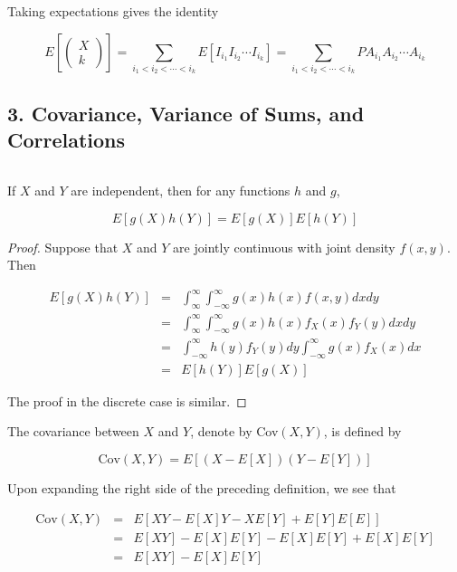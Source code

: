 Taking expectations gives the identity

$$E\left[ \left( \begin{matrix}
	X \\ k
\end{matrix} \right) \right] = \sum_{i_1 < i_2 < \cdots < i_k}E[I_{i_1} I_{i_2}\cdots I_{i_k}] = \sum_{i_1 < i_2 < \cdots < i_k} P{A_{i_1}A_{i_2} \cdots A_{i_k}}$$

\newpage

\subsection*{3. Covariance, Variance of Sums, and Correlations}$ $

\begin{prop*}
	If $X$ and $Y$ are independent, then for any functions $h$ and $g$, 
	
	$$E[g(X)h(Y)] = E[g(X)]E[h(Y)]$$
\end{prop*}

\begin{proof}
	Suppose that $X$ and $Y$ are jointly continuous with joint density $f(x,y)$. Then
	
	\begin{eqnarray*}
		E[g(X)h(Y)] &=& \int^{\infty}_{\infty} \int^{\infty}_{-\infty} g(x)h(x)f(x,y)dxdy\\
		&=& \int^{\infty}_{\infty} \int^{\infty}_{-\infty} g(x)h(x)f_X(x)f_Y(y)dxdy \\
		&=& \int^{\infty}_{-\infty} h(y)f_Y(y)dy \int^{\infty}_{-\infty}g(x)f_X(x)dx \\
		&=& E[h(Y)]E[g(X)]
	\end{eqnarray*}
	
	The proof in the discrete case is similar.
\end{proof}

\begin{defn}
	The covariance between $X$ and $Y$, denote by Cov$(X,Y)$, is defined by
	
	$$ \text{Cov}(X,Y) = E[(X - E[X])(Y - E[Y])] $$
\end{defn}

Upon expanding the right side of the preceding definition, we see that

\begin{eqnarray*}
	\text{Cov}(X,Y) &=& E[XY - E[X] Y - XE[Y] + E[Y]E[E]] \\
	&=& E[XY] - E[X]E[Y] - E[X]E[Y] + E[X]E[Y] \\
	&=& E[XY] - E[X]E[Y]
\end{eqnarray*}

